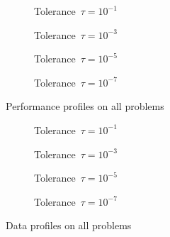 \begin{figure}[ht]
    \centering
    \begin{subfigure}[b]{0.49\textwidth}
        \centering
        \caption{Tolerance~$\tau = 10^{-1}$}
    \end{subfigure}
    \hfill
    \begin{subfigure}[b]{0.49\textwidth}
        \centering
        \caption{Tolerance~$\tau = 10^{-3}$}
    \end{subfigure}
    \begin{subfigure}[b]{0.49\textwidth}
        \centering
        \caption{Tolerance~$\tau = 10^{-5}$}
    \end{subfigure}
    \hfill
    \begin{subfigure}[b]{0.49\textwidth}
        \centering
        \caption{Tolerance~$\tau = 10^{-7}$}
    \end{subfigure}
    \caption{Performance profiles on all problems}
    \label{fig:perf-all-problems}
\end{figure}

\begin{figure}[ht]
    \centering
    \begin{subfigure}[b]{0.49\textwidth}
        \centering
        \caption{Tolerance~$\tau = 10^{-1}$}
    \end{subfigure}
    \hfill
    \begin{subfigure}[b]{0.49\textwidth}
        \centering
        \caption{Tolerance~$\tau = 10^{-3}$}
    \end{subfigure}
    \begin{subfigure}[b]{0.49\textwidth}
        \centering
        \caption{Tolerance~$\tau = 10^{-5}$}
    \end{subfigure}
    \hfill
    \begin{subfigure}[b]{0.49\textwidth}
        \centering
        \caption{Tolerance~$\tau = 10^{-7}$}
    \end{subfigure}
    \caption{Data profiles on all problems}
    \label{fig:data-all-problems}
\end{figure}

